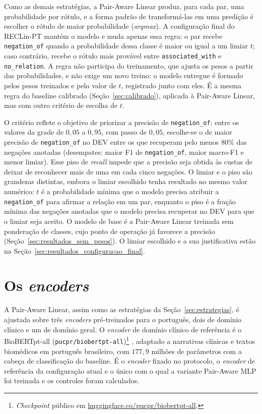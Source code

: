 Como as demais estratégias, a Pair-Aware Linear produz, para cada par, uma
probabilidade por rótulo, e a forma padrão de transformá-las em uma predição é
escolher o rótulo de maior probabilidade (\emph{argmax}). A configuração final do
RECLin-PT mantém o modelo e muda apenas essa regra: o par recebe
\texttt{negation\_of} quando a probabilidade dessa classe é maior ou igual a um
limiar $t$; caso contrário, recebe o rótulo mais provável entre
\texttt{associated\_with} e \texttt{no\_relation}. A regra não participa do
treinamento, que ajusta os pesos a partir das probabilidades, e não exige um novo
treino: o modelo entregue é formado pelos pesos treinados e pelo valor de $t$,
registrado junto com eles. É a mesma regra do baseline calibrado
(Seção~\ref{sec:calibrado}), aplicada à Pair-Aware Linear, mas com outro
critério de escolha de $t$.

O critério reflete o objetivo de priorizar a precisão de \texttt{negation\_of}:
entre os valores da grade de $0{,}05$ a $0{,}95$, com passo de $0{,}05$, escolhe-se
o de maior precisão de \texttt{negation\_of} no DEV entre os que recuperam pelo
menos $80\%$ das negações anotadas (desempates: maior F1 de
\texttt{negation\_of}, maior macro-F1 e menor limiar). Esse piso de \emph{recall}
impede que a precisão seja obtida às custas de deixar de reconhecer mais de uma em
cada cinco negações. O limiar e o piso são grandezas distintas, embora o limiar
escolhido tenha resultado no mesmo valor numérico: $t$ é a probabilidade mínima
que o modelo precisa atribuir a \texttt{negation\_of} para afirmar a relação em
um par, enquanto o piso é a fração mínima das negações anotadas que o modelo
precisa recuperar no DEV para que o limiar seja aceito. O modelo de base é a Pair-Aware Linear treinada sem ponderação
de classes, cujo ponto de operação já favorece a precisão
(Seção~\ref{sec:resultados_sem_pesos}). O limiar escolhido e a sua justificativa
estão na Seção~\ref{sec:resultados_configuracao_final}.

\section{Os \emph{encoders}}
\label{sec:encoders}

A Pair-Aware Linear, assim como as estratégias da Seção~\ref{sec:estrategias}, é
ajustada sobre três \emph{encoders} pré-treinados para o português, dois de domínio
clínico e um de domínio geral. O \emph{encoder} de domínio clínico de referência é o
BioBERTpt-all
(\texttt{pucpr/biobertpt-all})\footnote{\emph{Checkpoint} público em
\href{https://huggingface.co/pucpr/biobertpt-all}{huggingface.co/pucpr/biobertpt-all}.}
\cite{schneider_2020_biobertpt}, adaptado a narrativas clínicas e textos
biomédicos em português brasileiro, com $177{,}9$ milhões de parâmetros com a
cabeça de classificação do baseline. É o \emph{encoder} fixado no protocolo, o \emph{encoder} de referência da configuração atual e o único com o qual a variante Pair-Aware MLP foi treinada e os controles foram
calculados.

